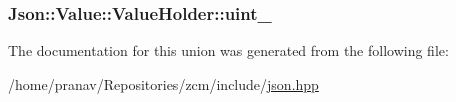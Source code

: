 \subsubsection[{\texorpdfstring{uint\+\_\+}{uint_}}]{ Json\+::\+Value\+::\+Value\+Holder\+::uint\+\_\+}\hypertarget{unionJson_1_1Value_1_1ValueHolder_aab65665dc15a24a29a8e93cdeeaa7e50}{}\label{unionJson_1_1Value_1_1ValueHolder_aab65665dc15a24a29a8e93cdeeaa7e50}


The documentation for this union was generated from the following file\+:\begin{DoxyCompactItemize}
\item 
/home/pranav/\+Repositories/zcm/include/\hyperlink{json_8hpp}{json.\+hpp}\end{DoxyCompactItemize}
